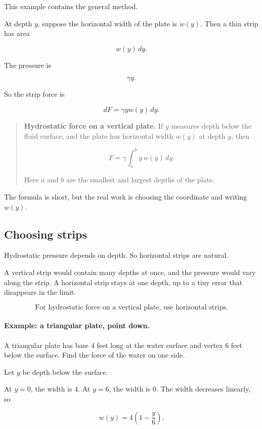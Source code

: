 This example contains the general method.

At depth \(y\), suppose the horizontal width of the plate is \(w(y)\).  Then a thin strip
has area

\[
w(y)\,dy.
\]

The pressure is

\[
\gamma y.
\]

So the strip force is

\[
dF=\gamma y w(y)\,dy.
\]

\begin{quote}
\textbf{Hydrostatic force on a vertical plate.}
If \(y\) measures depth below the fluid surface, and the plate has horizontal width
\(w(y)\) at depth \(y\), then

\[
\boxed{
F=\gamma\int_a^b y\,w(y)\,dy.
}
\]

Here \(a\) and \(b\) are the smallest and largest depths of the plate.
\end{quote}

The formula is short, but the real work is choosing the coordinate and writing \(w(y)\).

\subsection{Choosing strips}
\label{subsec:choosing-strips-hydrostatic}

Hydrostatic pressure depends on depth.  So horizontal strips are natural.

A vertical strip would contain many depths at once, and the pressure would vary along
the strip.  A horizontal strip stays at one depth, up to a tiny error that disappears in the
limit.

\[
\boxed{
\text{For hydrostatic force on a vertical plate, use horizontal strips.}
}
\]

\paragraph{Example: a triangular plate, point down.}
A triangular plate has base \(4\) feet long at the water surface and vertex \(6\) feet
below the surface.  Find the force of the water on one side.

Let \(y\) be depth below the surface.

At \(y=0\), the width is \(4\).  At \(y=6\), the width is \(0\).  The width decreases
linearly, so

\[
w(y)=4\left(1-\frac{y}{6}\right).
\]

